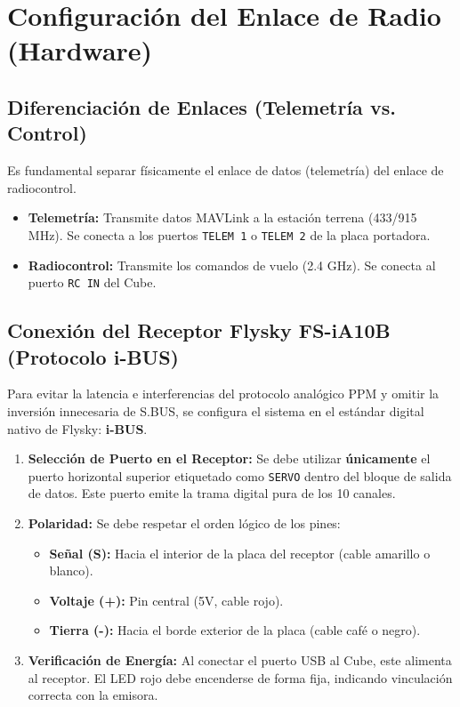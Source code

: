 \documentclass[12pt,a4paper]{article}
\begin{document}
\section{Configuración del Enlace de Radio (Hardware)}

\subsection{Diferenciación de Enlaces (Telemetría vs. Control)}
Es fundamental separar físicamente el enlace de datos (telemetría) del enlace de radiocontrol.
\begin{itemize}[leftmargin=*]
    \item \textbf{Telemetría:} Transmite datos MAVLink a la estación terrena (433/915 MHz). Se conecta a los puertos \texttt{TELEM 1} o \texttt{TELEM 2} de la placa portadora.
    \item \textbf{Radiocontrol:} Transmite los comandos de vuelo (2.4 GHz). Se conecta al puerto \texttt{RC IN} del Cube.
\end{itemize}

\subsection{Conexión del Receptor Flysky FS-iA10B (Protocolo i-BUS)}
Para evitar la latencia e interferencias del protocolo analógico PPM y omitir la inversión innecesaria de S.BUS, se configura el sistema en el estándar digital nativo de Flysky: \textbf{i-BUS}.
\begin{enumerate}[leftmargin=*]
    \item \textbf{Selección de Puerto en el Receptor:} Se debe utilizar \textbf{únicamente} el puerto horizontal superior etiquetado como \texttt{SERVO} dentro del bloque de salida de datos. Este puerto emite la trama digital pura de los 10 canales.
    \item \textbf{Polaridad:} Se debe respetar el orden lógico de los pines:
    \begin{itemize}
        \item \textbf{Señal (S):} Hacia el interior de la placa del receptor (cable amarillo o blanco).
        \item \textbf{Voltaje (+):} Pin central (5V, cable rojo).
        \item \textbf{Tierra (-):} Hacia el borde exterior de la placa (cable café o negro).
    \end{itemize}
    \item \textbf{Verificación de Energía:} Al conectar el puerto USB al Cube, este alimenta al receptor. El LED rojo debe encenderse de forma fija, indicando vinculación correcta con la emisora.
\end{enumerate}
\end{document}
